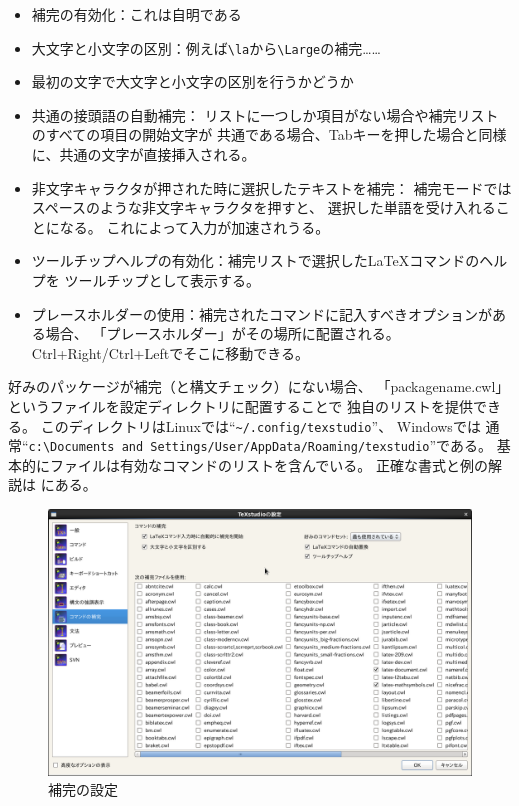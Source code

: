 \begin{itemize}
\item
  補完の有効化：これは自明である
\item
  大文字と小文字の区別：例えば\verb+\la+から\verb+\Large+の補完……
\item
  最初の文字で大文字と小文字の区別を行うかどうか
\item
  共通の接頭語の自動補完：
  リストに一つしか項目がない場合や補完リストのすべての項目の開始文字が
  共通である場合、Tabキーを押した場合と同様に、共通の文字が直接挿入される。
\item
  非文字キャラクタが押された時に選択したテキストを補完：
  補完モードではスペースのような非文字キャラクタを押すと、
  選択した単語を受け入れることになる。
  これによって入力が加速されうる。
\item
  ツールチップヘルプの有効化：補完リストで選択したLaTeXコマンドのヘルプを
  ツールチップとして表示する。
\item
  プレースホルダーの使用：補完されたコマンドに記入すべきオプションがある場合、
  「プレースホルダー」がその場所に配置される。
  Ctrl+Right/Ctrl+Leftでそこに移動できる。
\end{itemize}

好みのパッケージが補完（と構文チェック）にない場合、
「packagename.cwl」というファイルを設定ディレクトリに配置することで
独自のリストを提供できる。
このディレクトリはLinuxでは``\verb+~/.config/texstudio+''、
Windowsでは
通常``\verb+c:\Documents and Settings/User/AppData/Roaming/texstudio+''である。
基本的にファイルは有効なコマンドのリストを含んでいる。
正確な書式と例の解説は
にある。

\begin{figure}[H]
  \centering
  \includegraphics[width=.8\linewidth]{configure_completion.png}
  \caption{補完の設定}
\end{figure}

